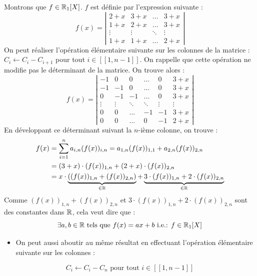\documentclass[12pt, a4paper]{report}
\begin{document}
\begin{outline}
    \1 Montrons que $f \in \mathbb{R}_1[X]$. $f$ est définie par l'expression suivante :
    $$f(x) = \left|\begin{matrix} 2+x & 3+x & \dots & 3+x \\ 1+x & 2+x & \dots & 3+x \\ \vdots & \vdots & \ddots & \vdots \\ 1+x & 1+x & \dots & 2+x \end{matrix}\right|$$
    On peut réaliser l'opération élémentaire suivante sur les colonnes de la matrice : $C_i \leftarrow C_i - C_{i+1}$ pour tout $i \in [\![1,n-1]\!]$. On rappelle que cette opération ne modifie pas le déterminant de la matrice. On trouve alors :
    $$f(x) = \left|\begin{matrix} 
    -1 &  0 & 0 & \dots & 0 & 3+x \\ 
    -1 & -1 & 0 &\dots & 0 & 3+x \\
    0  & -1 & -1 & \dots & 0 & 3+x \\
    \vdots & \vdots & \ddots & \ddots & \vdots & \vdots \\ 
    0 & 0 & \dots & -1 & -1 & 3+x \\
    0 & 0 & \dots & 0 & -1 & 2+x \end{matrix}\right|$$
    En développant ce déterminant suivant la $n$-ième colonne, on trouve :
    \begin{align*}
        f(x) &= \sum_{i=1}^{n} a_{i,n} (f(x))_{i,n} = a_{1,n} (f(x))_{1,1} + a_{2,n} (f(x))_{2,n} \\
        &= (3+x) \cdot (f(x))_{1,n} + (2+x) \cdot (f(x))_{2,n} \\
        &= x\cdot\underbrace{((f(x))_{1,n} + (f(x))_{2,n})}_{\in \mathbb{R}} + \underbrace{3 \cdot (f(x))_{1,n} + 2 \cdot (f(x))_{2,n}}_{\in \mathbb{R}}
    \end{align*}
    Comme $(f(x))_{1,n} + (f(x))_{2,n}$ et $3 \cdot (f(x))_{1,n} + 2 \cdot (f(x))_{2,n}$ sont des constantes dans $\mathbb{R}$, cela veut dire que :
    $$\exists a,b \in \mathbb{R} \text{ tels que } f(x) = ax + b \text{ i.e.: } f \in \mathbb{R}_1[X]$$

    \begin{itemize}
        \item On peut aussi aboutir au même résultat en effectuant l'opération élémentaire suivante sur les colonnes :
    \end{itemize}
    $$C_i \leftarrow C_i - C_n \text{ pour tout } i \in [\![1,n-1]\!]$$


\end{outline}
\end{document}
